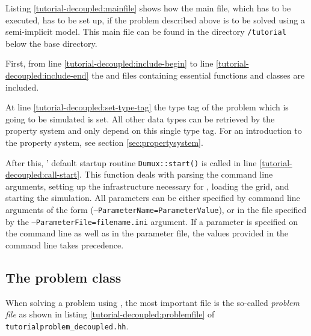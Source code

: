 Listing \ref{tutorial-decoupled:mainfile} shows how the main file, which has to be executed, has to be set up, if the problem described above is to be solved using a semi-implicit model. This main file can be found in the directory \texttt{/tutorial} below the \eWoms base directory.

\begin{lst}\label{tutorial-decoupled:mainfile} \mbox{}

\end{lst}

First, from line \ref{tutorial-decoupled:include-begin} to line
\ref{tutorial-decoupled:include-end} the \Dune and \eWoms files containing
essential functions and classes are included.

At line \ref{tutorial-decoupled:set-type-tag} the type tag of the
problem which is going to be simulated is set. All other data types
can be retrieved by the \eWoms property system and only depend on this
single type tag. For an introduction to the
property system, see section \ref{sec:propertysystem}.

After this, \eWoms' default startup routine \texttt{Dumux::start()} is
called in line \ref{tutorial-decoupled:call-start}. This function deals
with parsing the command line arguments, 
setting up the infrastructure necessary for \Dune, loading the grid, and
starting the simulation. All parameters can
be either specified by command line arguments of the form
(\texttt{--ParameterName=ParameterValue}), or in the file specified by the
\texttt{--ParameterFile=filename.ini} argument. If a parameter is
specified on the command line as well as in the parameter file, the
values provided in the command line takes
precedence.

\subsection{The problem class} \label{decoupled_problem}

When solving a problem using \eWoms, the most important file is the
so-called \textit{problem file} as shown in listing
\ref{tutorial-decoupled:problemfile} of
\texttt{tutorialproblem\_decoupled.hh}.

\begin{lst}\label{tutorial-decoupled:problemfile} \mbox{}

\end{lst}


